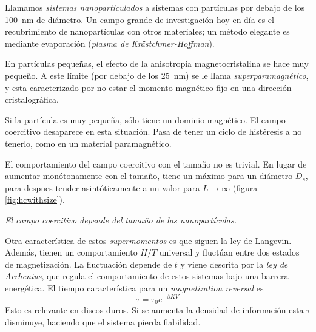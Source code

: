 \documentclass{tufte-book}
\newcommand{\sub}[1]{_{{\scriptscriptstyle\mathit{#1}}}}
\begin{document}
Llamamos \emph{sistemas nanoparticulados} a sistemas con partículas
por debajo de los \SI{100}{\nano\metre} de diámetro.
Un campo grande de investigación hoy en día es el recubrimiento de
nanopartículas con otros materiales; un método elegante es mediante
evaporación (\emph{plasma de Krästchmer-Hoffman}).

En partículas pequeñas, el efecto de la anisotropía magnetocristalina
se hace muy pequeño. A este límite (por debajo de los
\SI{25}{\nano\metre}) se le llama \emph{superparamagnético}, y esta
caracterizado por no estar el momento magnético fijo en una dirección
cristalográfica.


Si la partícula es muy pequeña, sólo tiene un dominio magnético. El
campo coercitivo desaparece en esta situación. Pasa de tener un ciclo
de histéresis a no tenerlo, como en un material paramagnético.

El comportamiento del campo coercitivo con el tamaño no es trivial. En
lugar de aumentar monótonamente con el tamaño, tiene un máximo para un
diámetro $D_s$, para despues tender asintóticamente a un valor para
$L→∞$ (figura \ref{fig:hcwithsize}).

\begin{marginfigure}
  \centering
  \caption{\itshape El campo coercitivo depende del tamaño de las nanopartículas.}
  \label{fig:hcwithsize}
\end{marginfigure}

Otra característica de estos \emph{supermomentos} es que siguen la ley
de Langevin.
Además, tienen un comportamiento $H/T$ universal y fluctúan entre dos
estados de magnetización. La fluctuación depende de $t$ y viene
descrita por la \emph{ley de Arrhenius}, que regula el comportamiento
de estos sistemas bajo una barrera energética. El tiempo
característica para un \emph{magnetization reversal} es
\begin{equation}
  τ = τ_0 e^{-βKV}
\end{equation}
Esto es relevante en discos duros. Si se aumenta la densidad de
información esta $τ$ disminuye, haciendo que el sistema pierda fiabilidad.
\end{document}
